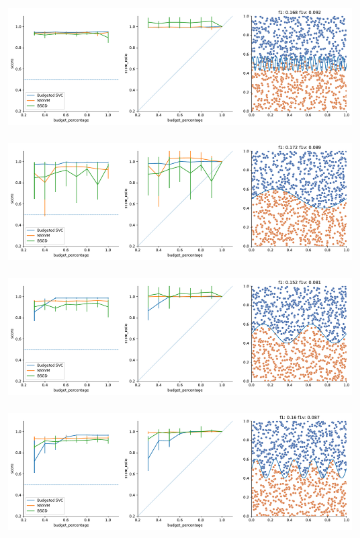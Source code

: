 \begin{figure}
    \begin{subfigure}{.5\textwidth}
        \centering
        \includegraphics[width=\textwidth]{img/comp_old/9.pdf}
    \end{subfigure}%
    \begin{subfigure}{.5\textwidth}
        \centering
        \includegraphics[width=\textwidth]{img/comp_old/10.pdf}
    \end{subfigure}
    \hfill
    \begin{subfigure}{.5\textwidth}
        \centering
        \includegraphics[width=\textwidth]{img/comp_old/11.pdf}
    \end{subfigure}
    \begin{subfigure}{.5\textwidth}
        \centering
        \includegraphics[width=\textwidth]{img/comp_old/12.pdf}

\end{subfigure}
\end{figure}
